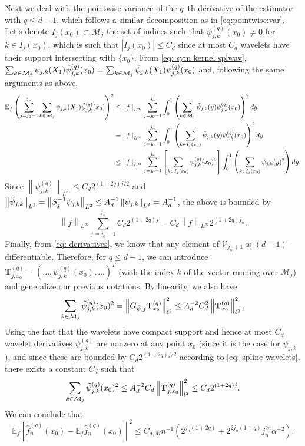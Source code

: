 \documentclass[preprint]{imsart}
\newcommand\norm[1]{\left\lVert#1\right\rVert}
\numberwithin{equation}{section}
\begin{document}
\begin{appendix}
Next we deal with the pointwise variance of the $q$--th derivative of the estimator with $q\leq d-1$, which follows a similar decomposition as in \eqref{eq:pointwise:var}. Let's denote $I_{j}(x_0)\subset \mathcal{M}_j$ the set of indices such that $\psi_{j,k}^{(q)}(x_0)\neq 0$ for $k\in I_{j}(x_0)$, which is such that $\left|I_{j}(x_0)\right|\leq C_d$ since at most $C_d$ wavelets have their support intersecting with $\{x_0\}$. From \eqref{eq: sym kernel splwav}, $\sum_{k\in\mathcal{M}_{j}} \psi_{j,k}(X_1)\Tilde{\psi}_{j,k}^{(q)}(x_0)=\sum_{k\in\mathcal{M}_{j}} \Tilde{\psi}_{j,k}(X_1)  \psi_{j,k}^{(q)}(x_0)$ and, following the same arguments as above,
\begin{align*}
    \mathbb{E}_f \left(  \sum_{j=j_0-1}^{j_n}\sum_{k\in\mathcal{M}_{j}} \psi_{j,k}(X_1)\Tilde{\psi}_{j,k}^{(q)}(x_0) \right)^2& \leq  \norm{f}_{L^\infty} \sum_{j=j_0-1}^{j_n}\int_0^1 \left(\sum_{k\in\mathcal{M}_{j}} \Tilde{\psi}_{j,k}(y)\psi_{j,k}^{(q)}(x_0) \right)^2 dy\\
    &=\norm{f}_{L^\infty} \sum_{j=j_0-1}^{j_n}\int_0^1 \left(\sum_{k\in I_j(x_0)} \Tilde{\psi}_{j,k}(y)\psi_{j,k}^{(q)}(x_0) \right)^2 dy\\
    &\leq  \norm{f}_{L^\infty} \sum_{j=j_0-1}^{j_n} \left[\sum_{k\in I_j(x_0)}\psi_{j,k}^{(q)}(x_0)^2\right]\int_0^1 \left(\sum_{k\in I_j(x_0)} \Tilde{\psi}_{j,k}(y)^2 \right) dy.
\end{align*}
Since $\norm{\psi_{j,k}^{(q)}}_{L^\infty}\leq C_{d} 2^{(1+2q)j/2}$ and $\norm{\Tilde{\psi}_{j,k}}_{L^2}=\norm{S_j^{-1}\psi_{j,k}}_{L^2}\leq A_d^{-1}\norm{\psi_{j,k}}_{L^2}=A_d^{-1}$, the above is bounded by
\[\norm{f}_{L^\infty}\sum_{j=j_0-1}^{j_n}  C_{d} 2^{(1+2q)j}= C_d \norm{f}_{L^\infty}2^{(1+2q)j_n}.\]
Finally, from \eqref{eq: derivatives}, we know that any element of $\mathcal{V}_{j_n+1}$ is $(d-1)$--differentiable. Therefore, for $q\leq d-1$, we can introduce $\mathbf{T}_{j,x_0}^{(q)}=(\dots,\psi_{j,k}^{(q)}(x_0),\dots)^T$ (with the index $k$ of the vector running over $\mathcal{M}_j$) and generalize our previous notations. By linearity, we also have
\[\sum_{k\in\mathcal{M}_{j}}\Tilde{\psi}_{j,k}^{(q)}(x_0)^{2}=\norm{G_{\tilde{\psi},j}\mathbf{T}_{x_0}^{(q)}}^2_{\ell^2}\leq A_d^{-2} C_d^2 \norm{\mathbf{T}_{x_0}^{(q)}}^2_{\ell^2}.\]
Using the fact that the wavelets have compact support and hence at most $C_d$ wavelet derivatives $\psi_{j,k}^{(q)}$ are nonzero at any point $x_0$ (since it is the case for $\psi_{j,k}$), and since these are bounded by $C_{d} 2^{(1+2q)j/2}$ according to \eqref{eq: spline wavelets}, there exists a constant $C_{d}$ such that 
\begin{equation}\label{eq: bound l2 sum adj wav}
    \sum_{k\in\mathcal{M}_{j}}\Tilde{\psi}_{j,k}^{(q)}(x_0)^{2}\leq A_d^{-2} C_d \norm{\mathbf{T}_{j,x_0}^{(q)}}^2_{l^2} \leq C_{d} 2^{(1+2q)j}.
\end{equation}
We can conclude that
\begin{equation}\label{variance stim sp pointwise}
    \mathbb{E}_f\left[\hat{f}_n^{(q)}(x_0)-\mathbb{E}_f\hat{f}_n^{(q)}(x_0)\right]^2 \leq C_{d,M}n^{-1}(2^{j_n(1+2q)} + 2^{2j_n(1+q)}j_n^{2a}\alpha^{-2}).
\end{equation}




\end{appendix}
\end{document}
